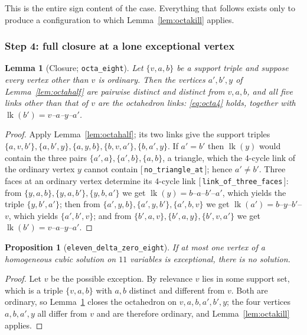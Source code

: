 \documentclass[11pt,reqno]{amsart}
\newcommand{\leanref}[1]{\textup{[\,\texttt{#1}\,]}}
\theoremstyle{plain}
\newtheorem{lemma}[theorem]{Lemma}
\newtheorem{proposition}[theorem]{Proposition}
\theoremstyle{definition}
\numberwithin{theorem}{section}
\newcommand{\lk}{\operatorname{lk}}
\begin{document}
This is the entire sign content of the case. Everything that follows exists only to produce a
configuration to which Lemma~\ref{lem:octakill} applies.

\subsubsection*{Step 4: full closure at a lone exceptional vertex}

\begin{lemma}[Closure; \texttt{octa\_eight}]\label{lem:octaeight}
Let $\{v,a,b\}$ be a support triple and suppose every vertex other than $v$ is ordinary. Then
the vertices $a', b', y$ of Lemma~\ref{lem:octahalf} are pairwise distinct and distinct from
$v, a, b$, and all five links other than that of $v$ are the octahedron links: \eqref{eq:octa4}
holds, together with $\lk(b') = v$--$a$--$y$--$a'$.
\end{lemma}

\begin{proof}
Apply Lemma~\ref{lem:octahalf}; its two links give the support triples
$\{a,v,b'\}, \{a,b',y\}, \{a,y,b\}, \{b,v,a'\}, \{b,a',y\}$. If $a' = b'$ then $\lk(y)$ would
contain the three pairs $\{a',a\}, \{a',b\}, \{a,b\}$, a triangle, which the $4$-cycle link of
the ordinary vertex $y$ cannot contain \leanref{no\_triangle\_at}; hence $a' \ne b'$. Three
faces at an ordinary vertex determine its $4$-cycle link \leanref{link\_of\_three\_faces}: from
$\{y,a,b\}, \{y,a,b'\}, \{y,b,a'\}$ we get $\lk(y) = b$--$a$--$b'$--$a'$, which yields the
triple $\{y,b',a'\}$; then from $\{a',y,b\}, \{a',y,b'\}, \{a',b,v\}$ we get
$\lk(a') = b$--$y$--$b'$--$v$, which yields $\{a',b',v\}$; and from
$\{b',a,v\}, \{b',a,y\}, \{b',v,a'\}$ we get $\lk(b') = v$--$a$--$y$--$a'$.
\end{proof}

\begin{proposition}[\texttt{eleven\_delta\_zero\_eight}]\label{prop:lone}
If at most one vertex of a homogeneous cubic solution on $11$ variables is exceptional, there is
no solution.
\end{proposition}

\begin{proof}
Let $v$ be the possible exception. By relevance $v$ lies in some support set, which is a triple
$\{v,a,b\}$ with $a, b$ distinct and different from $v$. Both are ordinary, so
Lemma~\ref{lem:octaeight} closes the octahedron on $v, a, b, a', b', y$; the four vertices
$a, b, a', y$ all differ from $v$ and are therefore ordinary, and Lemma~\ref{lem:octakill}
applies.
\end{proof}
\end{document}
